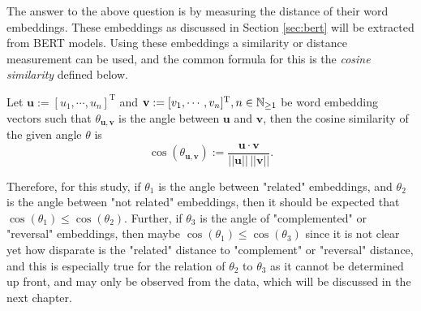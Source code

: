 The answer to the above question is by measuring the distance of their word embeddings. These embeddings as discussed in Section \ref{sec:bert} will be extracted from BERT models. Using these embeddings a similarity or distance measurement can be used, and the common formula for this is the \textit{cosine similarity} defined below.

\begin{defnx}
    Let $\mathbf{u}:=[u_1,\cdots,u_n]^{\text{T}}$ and $\mathbf{v}:=[v_1,\cdots,v_n]^{\text{T}},\linebreak n\in\mathbb{N}_{\geq 1}$ be word embedding vectors such that $\theta_{\mathbf{u},\mathbf{v}}$ is the angle between $\mathbf{u}$ and $\mathbf{v}$, then the cosine similarity of the given angle $\theta$ is
    \begin{equation}
        \cos(\theta_{\mathbf{u},\mathbf{v}}):=\frac{\mathbf{u}\cdot\mathbf{v}}{||\mathbf{u}||\,||\mathbf{v}||}.
    \end{equation}
\end{defnx}
Therefore, for this study, if $\theta_1$ is the angle between "related"   embeddings, and $\theta_2$ is the angle between "not related"   embeddings, then it should be expected that $\cos(\theta_1)\leq\cos(\theta_2)$. Further, if $\theta_3$ is the angle of "complemented" or "reversal"   embeddings, then maybe $\cos(\theta_1)\leq\cos(\theta_3)$ since it is not clear yet how disparate is the "related" distance to "complement" or "reversal" distance, and this is especially true for the relation of $\theta_2$ to $\theta_3$ as it cannot be determined up front, and may only be observed from the data, which will be discussed in the next chapter.
